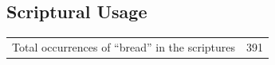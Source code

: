 
\subsection{Scriptural Usage} %
	\label{BREAD-SCRIPTURES}
	
	\begin{tabular}{ll}
		Total occurrences of ``bread'' in the scriptures & 391 \\
	\end{tabular}

	
	
			
			
		
			
				
